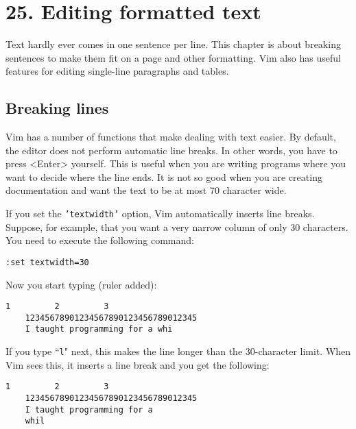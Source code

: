 \section{25. Editing formatted text}
Text hardly ever comes in one sentence per line.
This chapter is about breaking sentences to make them fit on a page and other formatting.
Vim also has useful features for editing single-line paragraphs and tables.
\subsection{Breaking lines}
\localtableofcontents
Vim has a number of functions that make dealing with text easier.
By default, the editor does not perform automatic line breaks.
In other words, you have to press <Enter> yourself.
This is useful when you are writing programs where you want to decide where the line ends.
It is not so good when you are creating documentation and want the text to be at most 70 character wide.

If you set the \texttt{'textwidth'} option, Vim automatically inserts line breaks.
Suppose, for example, that you want a very narrow column of only 30 characters.
You need to execute the following command:

\begin{Verbatim}[samepage=true]
 :set textwidth=30
\end{Verbatim}

Now you start typing (ruler added):

\begin{Verbatim}[samepage=true]
             1         2         3
    12345678901234567890123456789012345
    I taught programming for a whi 
\end{Verbatim}

If you type ``\texttt{l}" next, this makes the line longer than the 30-character limit.
When Vim sees this, it inserts a line break and you get the following:

\begin{Verbatim}[samepage=true]
             1         2         3
    12345678901234567890123456789012345
    I taught programming for a 
    whil 
\end{Verbatim}

